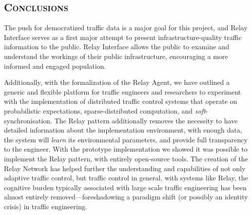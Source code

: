 \documentclass[a4paper,10pt]{article}
\begin{document}
\begin{multicols}{2}
\section{\textsc{Conclusions}}
The push for democratized traffic data is a major goal for this project, and Relay Interface serves as a first major attempt to present infrastructure-quality traffic information to the public. 
Relay Interface allows the public to examine and understand the workings of their public infrastructure, encouraging a more informed and engaged population.

Additionally, with the formalization of the Relay Agent, we have outlined a generic and flexible platform for traffic engineers and researchers to experiment with the implementation of distributed traffic control systems that operate on probabilistic expectations, sparse-distributed computation, and \emph{soft}-synchronisation.
The Relay pattern additionally removes the necessity to have detailed information about the implementation environment, with enough data, the system will \emph{learn} its environmental parameters, and provide full transparency to the engineer.
With the prototype implementation we showed it was possible to implement the Relay pattern, with entirely open-source tools.
The creation of the Relay Network has helped further the understanding and capabilities of not only adaptive traffic control, but traffic control in general, with systems like Relay, the cognitive burden typically associated with large scale traffic engineering has been almost entirely removed---foreshadowing a paradigm shift (or possibly an identity crisis) in traffic engineering.





\end{multicols}
\end{document}
